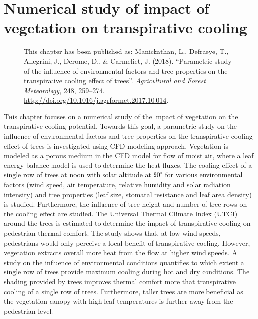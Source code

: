 \chapter{Numerical study of impact of vegetation on transpirative cooling}
\label{ch:parametricstudy}
\def\figdir{chapters/ch03_numericalmodelsimple/figures}

\begin{figure}[h]
	\centering
	\begin{minipage}{0.9\textwidth}
		\textsf{ \footnotesize This chapter has been published as: Manickathan, L., Defraeye, T., Allegrini, J., Derome, D., \& Carmeliet, J. (2018). ``Parametric study of the influence of environmental factors and tree properties on the transpirative cooling effect of trees''. \textit{Agricultural and Forest Meteorology}, 248, 259–274. \url{http://doi.org/10.1016/j.agrformet.2017.10.014}.}
	\end{minipage}
\end{figure}
\vspace{2em}

	
\lettrine[lines=3,nindent=0em,loversize=0.1]{T}{h}is chapter focuses on a numerical study of the impact of vegetation on the transpirative cooling potential. Towards this goal, a parametric study on the influence of environmental factors and tree properties on the transpirative cooling effect of trees is investigated using CFD modeling approach. Vegetation is modeled as a porous medium in the CFD model for flow of moist air, where a leaf energy balance model is used to determine the heat fluxes. The cooling effect of a single row of trees at noon with solar altitude at $90^{\circ}$ for various environmental factors (wind speed, air temperature, relative humidity and solar radiation intensity) and tree properties (leaf size, stomatal resistance and leaf area density) is studied. Furthermore, the influence of tree height and number of tree rows on the cooling effect are studied. The Universal Thermal Climate Index (UTCI) around the trees is estimated to determine the impact of transpirative cooling on pedestrian thermal comfort. The study shows that, at low wind speeds, pedestrians would only perceive a local benefit of transpirative cooling. However, vegetation extracts overall more heat from the flow at higher wind speeds. A study on the influence of environmental conditions quantifies to which extent a single row of trees provide maximum cooling during hot and dry conditions. The shading provided by trees improves thermal comfort more that transpirative cooling of a single row of trees. Furthermore, taller trees are more beneficial as the vegetation canopy with high leaf temperatures is further away from the pedestrian level.


